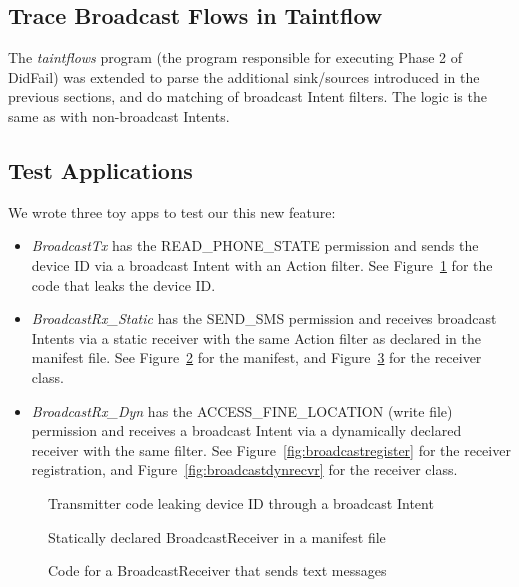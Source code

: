 \subsection{Trace Broadcast Flows in Taintflow}
The \emph{taintflows} program (the program responsible for executing Phase 2 of DidFail) was extended to parse the additional sink/sources introduced in the previous sections, and do matching of broadcast Intent filters. The logic is the same as with non-broadcast Intents.

\subsection{Test Applications}
We wrote three toy apps to test our this new feature:

\begin{itemize}
\item{} \emph{BroadcastTx} has the READ\_PHONE\_STATE permission and sends the device ID via a broadcast Intent with an Action filter. See Figure~\ref{fig:broadcastleak} for the code that leaks the device ID.

\item{} \emph{BroadcastRx\_Static} has the SEND\_SMS permission and receives broadcast Intents via a static receiver with the same Action filter as declared in the manifest file.  See Figure~\ref{fig:broadcastmanifest} for the manifest, and Figure~\ref{fig:broadcaststaticrecvr} for the receiver class.

\item{} \emph{BroadcastRx\_Dyn} has the ACCESS\_FINE\_LOCATION (write file) permission and receives a broadcast Intent via a dynamically declared receiver with the same filter.  See Figure~\ref{fig:broadcastregister} for the receiver registration, and Figure~\ref{fig:broadcastdynrecvr} for the receiver class. 
\end{itemize} 

\begin{figure}[!h]

\caption{Transmitter code leaking device ID through a broadcast Intent}
\label{fig:broadcastleak}
\end{figure}

\begin{figure}[!h]

\caption{Statically declared BroadcastReceiver in a manifest file}
\label{fig:broadcastmanifest}
\end{figure}

\begin{figure}[!h]

\caption{Code for a BroadcastReceiver that sends text messages}
\label{fig:broadcaststaticrecvr}
\end{figure}

